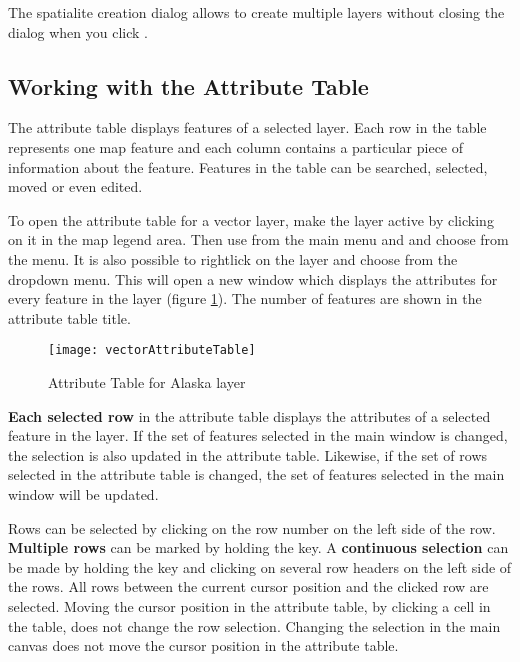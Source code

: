 The spatialite creation dialog allows to create multiple layers without
closing the dialog when you click .

\subsection{Working with the Attribute Table}
\label{sec:attribute table}

The attribute table displays features of a selected layer. Each row in the table
represents one map feature and each column contains a particular piece of
information about the feature. Features in the table can be searched, selected,
moved or even edited.

To open the attribute table for a vector layer, make the layer active by clicking
on it in the map legend area. Then use  from the main menu
and and choose 
from the menu. It is also possible to rightlick on the layer and
choose  from the
dropdown menu.
This will open a new window which displays the attributes for
every feature in the layer (figure \ref{fig:attributetable}). The number of features
are shown in the attribute table title.

\begin{figure}[ht]
   \centering
   \texttt{[image: vectorAttributeTable]}
   \caption{Attribute Table for Alaska layer \nixcaption}\label{fig:attributetable}
\end{figure}


\textbf{Each selected row} in the attribute table displays the attributes of a
selected feature in the layer. If the set of features selected in the main window
is changed, the selection is also updated in the attribute table.
Likewise, if the set of rows selected in the attribute table is changed, the
set of features selected in the main window will be updated.

Rows can be selected by clicking on the row number on the left side of the
row. \textbf{Multiple rows} can be marked by holding the  key. A
\textbf{continuous selection} can be made by holding the  key and
clicking on several row headers on the left side of the rows. All rows between the
current cursor position and the clicked row are selected. Moving the cursor
position in the attribute table, by clicking a cell in the table, does not change
the row selection. Changing the selection in the main canvas does not move the
cursor position in the attribute table.

